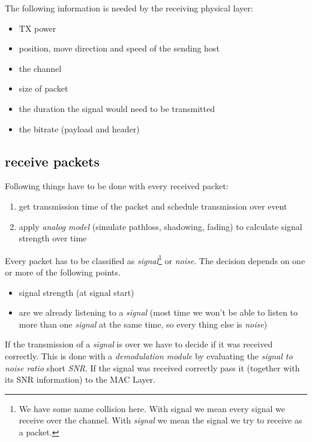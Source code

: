 The following information is needed by the receiving physical layer:

\begin{itemize}
\item TX power
\item position, move direction and speed of the sending host
\item the channel
\item size of packet
\item the duration the signal would need to be transmitted
\item the bitrate (payload and header)

\end{itemize}

\subsection{receive packets}

Following things have to be done with every received packet:

\begin{enumerate}
 \item get transmission time of the packet and schedule transmission over event
 \item apply \textit{analog model} (simulate pathloss, shadowing, fading) to 
 			 calculate signal strength over time 
\end{enumerate}

Every packet has to be classified as 
\textit{signal}\footnote{We have some name collision here. With signal 
												 we mean every signal we receive over the channel. 
												 With \textit{signal} we mean the signal we try to 
												 receive as a packet.} 
or \textit{noise}. The decision depends on one or more of the following 
points.

\begin{itemize}
 \item signal strength (at signal start)
 \item are we already listening to a \textit{signal} (most time we won't be able to listen to more than one 
 			 \textit{signal} at the same time, so every thing else is \textit{noise})
\end{itemize}

If the transmission of a \textit{signal} is over we have to decide if it was received correctly. This is
done with a \textit{demodulation module} by evaluating the \textit{signal to noise ratio} short \textit{SNR}. If the signal was received correctly pass it (together with its SNR information) to the MAC Layer.

